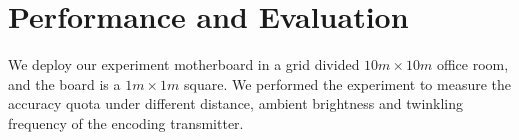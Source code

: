 \documentclass[conference]{IEEEtran}
\begin{document}
\section{\textbf{Performance and Evaluation}}

We deploy our experiment motherboard in a grid divided $10m \times 10m$ office room, and the board is a $1m \times 1m$ square. We performed the experiment to measure the accuracy quota under different distance, ambient brightness and twinkling frequency of the encoding transmitter.















\end{document}
